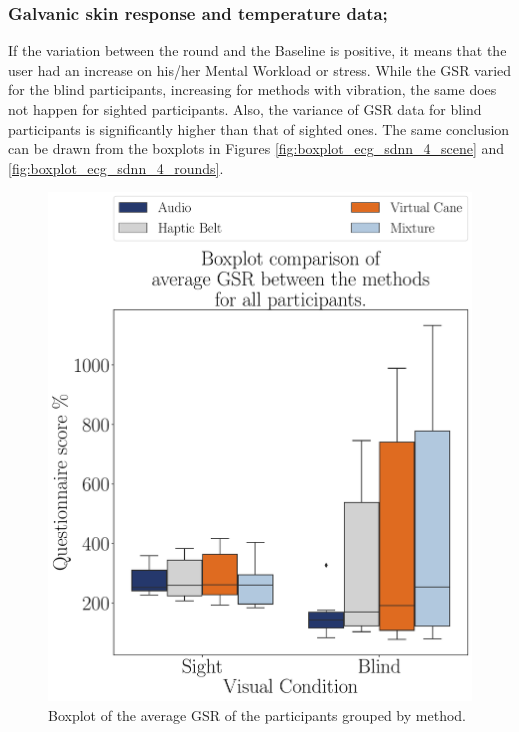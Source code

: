 \subsubsection{Galvanic skin response and temperature data;}
\label{subsubsec:results_gsr_temp_2}

If the variation between the round and the Baseline is positive, it means that the user had an increase on his/her Mental Workload or stress. While the GSR varied for the blind participants, increasing for methods with vibration, the same does not happen for sighted participants. Also, the variance of GSR data for blind participants is significantly higher than that of sighted ones. The same conclusion can be drawn from the boxplots in Figures \ref{fig:boxplot_ecg_sdnn_4_scene} and \ref{fig:boxplot_ecg_sdnn_4_rounds}. 

\begin{figure}[!htb]
    \centering
    \includegraphics[width = 0.75\linewidth]{3 - Resultados/Figuras/boxplot_gsr_avg_4_scene.pdf}
    \caption{Boxplot of the average GSR of the participants grouped by method.}
    \label{fig:boxplot_gsr_avg_4_scene}
\end{figure}
